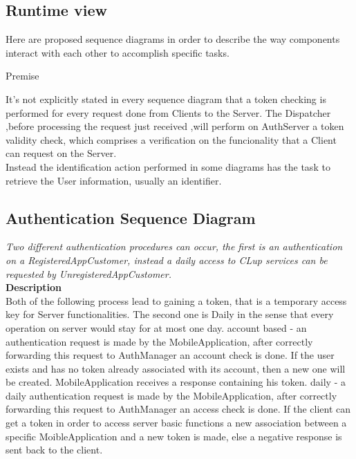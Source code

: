 \subsection{Runtime view}
Here are proposed sequence diagrams in order to describe the way components interact with each other to accomplish specific tasks.\\

\begin{center} 
Premise\\
\end{center}
It’s not explicitly stated in every sequence diagram that a token checking is performed for every request done from Clients to the Server. The Dispatcher ,before processing the request just received ,will perform on AuthServer a token validity check, which comprises a verification on the funcionality that a Client can request on the Server. \\ 
Instead the identification action performed in some diagrams has the task to retrieve the User information, usually an identifier.
\\

\newpage
\subsection{Authentication Sequence Diagram}
\textit{Two different authentication procedures can occur, the first is an authentication on a RegisteredAppCustomer, instead a daily access to CLup services can be requested by UnregisteredAppCustomer.\\}
\textbf{Description\\}
Both of the following process lead to gaining a token, that is a temporary access key for Server functionalities. The second one is Daily in the sense that every operation on server would stay for at most one day.
account based - an authentication request is made by the MobileApplication, after correctly forwarding this request to AuthManager an account check is done. If the user exists and has no token already associated with its account, then a new one will be created. MobileApplication receives a response containing his token. 
daily - a daily authentication request is made by the MobileApplication, after correctly forwarding this request to AuthManager an access check is done. If the client can get a token in order to access server basic functions a new association between a specific MoibleApplication and a new token is made, else a negative response is sent back to the client. \\

